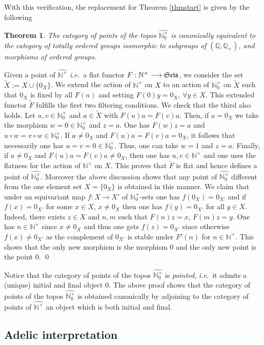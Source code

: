\documentclass[noams,lp]{compositio}
\newtheorem{thm}{Theorem}[section] %
\def\N{{\mathbb N}}
\def\Q{{\mathbb Q}}
\newcommand{\ie}{{\it i.e.\/}\ }
\def\Se{\frak{ Sets}}
\def\nt{\N^{\times}}
\def\wnt{{\widehat{\N^{\times}}}}
\def\nto{\N_0^{\times}}
\def\wnto{{\widehat{\nto}}}
\begin{document}
With this verification, the replacement for Theorem \ref{thmstart} is given by the following
\begin{thm}\label{thmstartbis}
The category of points of the topos $\widehat{ \nto} $ is canonically equivalent to the category of totally ordered groups isomorphic to  subgroups of   $(\Q,\Q_+)$, and  morphisms of ordered groups.
\end{thm}
\proof Given a point of $\wnt$ \ie a flat functor $F:\nt\longrightarrow \Se$, we consider the set $\tilde X:=X\cup \{0_X\}$. We extend the action of $\nt$ on $X$ to an action of $\nto$ on $\tilde X$ such that $0_X$ is fixed by all $F(n)$ and setting $F(0)y=0_X$, $\forall y\in X$. This extended functor $\tilde F$ fulfills the first two filtering conditions. We check that the third also holds. Let $u,v\in \nto$ and $a\in \tilde X$ with $F(u)a=F(v)a$. Then, if $a=0_X$ we take the morphism $w=0\in \nto$ and $z=a$. One has $F(w)z=a$ and $u\circ w=v\circ w\in\nto$. If $a\neq 0_X$ and $F(u)a=F(v)a=0_X$, it follows that necessarily one has $u=v=0\in \nto$. Thus, one can take $w=1$ and $z=a$. Finally, if $a\neq 0_X$ and $F(u)a=F(v)a\neq 0_X$, then one has $u,v\in \nt$ and one uses the flatness for the action of $\nt$ on $X$. This proves that $\tilde F$ is flat and hence defines a point of $\wnto$. Moreover the above discussion shows that any point of $\wnto$ different from the one element set $X=\{0_X\}$ is obtained in this manner. We claim that under an equivariant map $f:X\to X'$ of $\nto$-sets one has $f(0_X)=0_{X'}$ and if $f(x)=0_{X'}$ for some $x\in X$, $x\neq 0_X$ then one has $f(y)=0_{X'}$ for all $y\in X$. Indeed, there exists $z\in X$ and $n,m$ such that $F(n)z=x$, $F(m)z=y$. One has $n\in \nt$ since $x\neq 0_X$ and thus one gets $f(z)=0_{X'}$ since otherwise $f(x)\neq 0_{X'}$ as the complement of $0_{X'}$ is stable under $F'(n)$ for $n\in \nt$. This shows that the only new morphism is the morphism $0$ and the only new point is the point $0$. \qed\vspace{.1in}

Notice that the category of points of the topos $\widehat{ \nto} $ is {\em pointed}, \ie it admits a (unique) initial and final object $0$. The above proof shows  that the category of points of the topos $\widehat{ \nto} $ is  obtained canonically by adjoining to the category of points of $\wnt$ an object which is both initial and final.
\subsection{Adelic interpretation}\label{sectadel}
\end{document}
